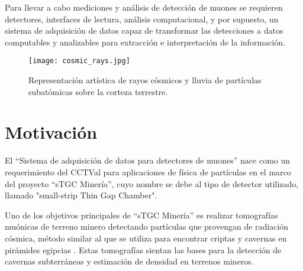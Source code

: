 	Para llevar a cabo mediciones y análisis de detección de muones se requieren detectores, interfaces de lectura, análisis computacional, y por supuesto, un sistema de adquisición de datos capaz de  transformar las detecciones a datos computables y analizables para extracción e interpretación de la información.
	
	\begin{figure}[h]
		\centering
		\texttt{[image: cosmic\_rays.jpg]}
		\caption{Representación artística de rayos cósmicos y lluvia de partículas subatómicas sobre la corteza terrestre.}
		\label{img:cosmic-ray}
	\end{figure}
	
	
\section{Motivación}
	El ``Sistema de adquisición de datos para detectores de muones'' nace como un requerimiento del CCTVal  para aplicaciones de física de partículas en el marco del proyecto ``sTGC Minería'', cuyo nombre se debe al tipo de detector utilizado, llamado "small-strip Thin Gap Chamber".
	
	Uno de los objetivos principales de ``sTGC Minería'' es realizar tomografías muónicas de terreno minero detectando partículas que provengan de radiación cósmica, método similar al que se utiliza para encontrar criptas y cavernas en pirámides egipcias \cite{AlvarezSearchPyramids}. Estas tomografías sientan las bases para la detección de cavernas subterráneas y estimación de densidad en terrenos mineros. %

